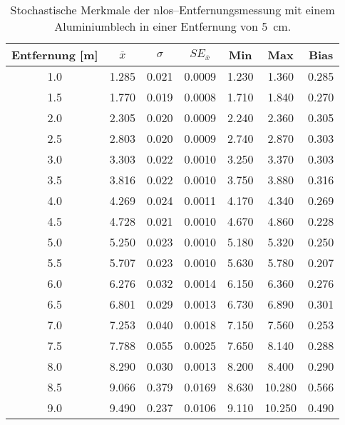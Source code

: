 \begin{appendices}
\begin{table}[h]
	\centering
	\begin{tabular}{||c||ccc||cc||c||}
\hline
Entfernung [\si{\meter}] & $\overline{x}$ & $\sigma$ & $SE_{\overline{x}}$ & Min & Max & Bias \\
\hline
\hline
\num{1.0} & \num{1.285} & \num{0.021} & \num{0.0009} & \num{1.230} & \num{1.360} & \num{0.285} \\
\num{1.5} & \num{1.770} & \num{0.019} & \num{0.0008} & \num{1.710} & \num{1.840} & \num{0.270} \\
\num{2.0} & \num{2.305} & \num{0.020} & \num{0.0009} & \num{2.240} & \num{2.360} & \num{0.305} \\
\num{2.5} & \num{2.803} & \num{0.020} & \num{0.0009} & \num{2.740} & \num{2.870} & \num{0.303} \\
\num{3.0} & \num{3.303} & \num{0.022} & \num{0.0010} & \num{3.250} & \num{3.370} & \num{0.303} \\
\num{3.5} & \num{3.816} & \num{0.022} & \num{0.0010} & \num{3.750} & \num{3.880} & \num{0.316} \\
\num{4.0} & \num{4.269} & \num{0.024} & \num{0.0011} & \num{4.170} & \num{4.340} & \num{0.269} \\
\num{4.5} & \num{4.728} & \num{0.021} & \num{0.0010} & \num{4.670} & \num{4.860} & \num{0.228} \\
\num{5.0} & \num{5.250} & \num{0.023} & \num{0.0010} & \num{5.180} & \num{5.320} & \num{0.250} \\
\num{5.5} & \num{5.707} & \num{0.023} & \num{0.0010} & \num{5.630} & \num{5.780} & \num{0.207} \\
\num{6.0} & \num{6.276} & \num{0.032} & \num{0.0014} & \num{6.150} & \num{6.360} & \num{0.276} \\
\num{6.5} & \num{6.801} & \num{0.029} & \num{0.0013} & \num{6.730} & \num{6.890} & \num{0.301} \\
\num{7.0} & \num{7.253} & \num{0.040} & \num{0.0018} & \num{7.150} & \num{7.560} & \num{0.253} \\
\num{7.5} & \num{7.788} & \num{0.055} & \num{0.0025} & \num{7.650} & \num{8.140} & \num{0.288} \\
\num{8.0} & \num{8.290} & \num{0.030} & \num{0.0013} & \num{8.200} & \num{8.400} & \num{0.290} \\
\num{8.5} & \num{9.066} & \num{0.379} & \num{0.0169} & \num{8.630} & \num{10.280} & \num{0.566} \\
\num{9.0} & \num{9.490} & \num{0.237} & \num{0.0106} & \num{9.110} & \num{10.250} & \num{0.490} \\
\hline
	\end{tabular}
	\caption{Stochastische Merkmale der \Gls{nlos}--Entfernungsmessung mit einem Aluminiumblech in einer Entfernung von \SI{5}{\centi\meter}.}
	\label{tab:entfernungsmessung_2018_01_20_nlos_metal}
\end{table}


\end{appendices}

